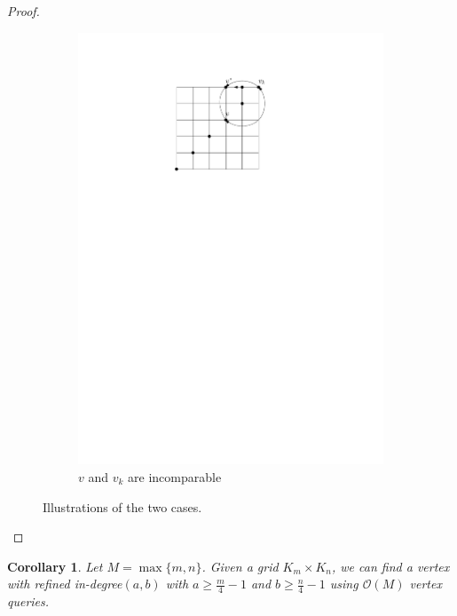 \documentclass[a4paper,10pt]{article}
\newtheorem{corollary}{Corollary}
\newcommand{\indegree}{refined in-degree\xspace}
\begin{document}
\begin{proof}
\begin{figure}[htbp]
\begin{subfigure}[b]{0.4\textwidth}
           \includegraphics[scale = 0.7]{seedlemma_fig2_cas2.pdf}
           \caption{$v$ and $v_k$ are incomparable}
       \end{subfigure}
       \caption{Illustrations of the two cases. }
       \label{fig:seedlem2}
   \end{figure}
\end{proof}

\begin{corollary}
 Let $M = \max\{m,n\}$. Given a grid $K_{m} \times K_{n}$, we can find a vertex with \indegree $(a,b)$ with $a \geq \frac{m}{4} - 1$ and  $b \geq \frac{n}{4} - 1$ using $\mathcal{O}(M)$ vertex queries.
\end{corollary}
\end{document}
